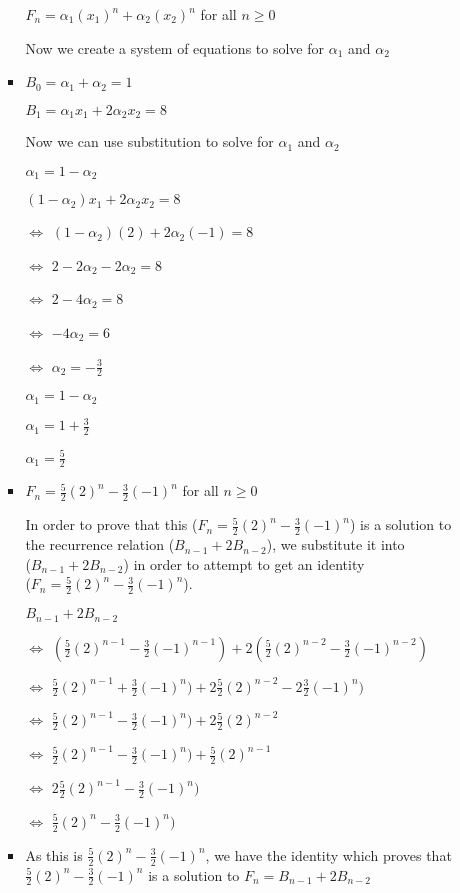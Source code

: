 \documentclass{article}
\begin{document}
\begin{enumerate}
\begin{enumerate}
\begin{itemize}
      $F_{n}=\alpha_{1}(x_{1})^{n}+\alpha_{2}(x_{2})^{n} $ for all $n\geq0$
    \item [] Now we create a system of equations to solve for $\alpha_{1}$ and $\alpha_{2}$
    \item $B_{0}=\alpha_{1}+\alpha_{2}=1$
    \item [] $B_{1}=\alpha_{1}x_{1}+2\alpha_{2}x_{2}=8$
    \item [] Now we can use substitution to solve for $\alpha_{1}$ and $\alpha_{2}$
    \item [] $\alpha_{1}=1-\alpha_{2}$
    \item [] $(1-\alpha_{2})x_{1} +2\alpha_{2}x_{2}=8$
    \item [$\Leftrightarrow$] $(1-\alpha_{2})(2) +2\alpha_{2}(-1)=8$
    \item [$\Leftrightarrow$] $2-2\alpha_{2} -2\alpha_{2}=8$
    \item [$\Leftrightarrow$] $2-4\alpha_{2}=8$
    \item [$\Leftrightarrow$] $-4\alpha_{2}=6$
    \item [$\Leftrightarrow$] $\alpha_{2}=-\frac{3}{2}$
    \item [] $\alpha_{1}=1-\alpha_{2}$
    \item [] $\alpha_{1}=1+\frac{3}{2}$
    \item [] $\alpha_{1}=\frac{5}{2}$
    \item $F_{n}=\frac{5}{2}(2)^{n}-\frac{3}{2}(-1)^{n} $ for all $n\geq0$
    \item [] In order to prove that this ($F_{n}=\frac{5}{2}(2)^{n}-\frac{3}{2}(-1)^{n}$) is a solution to the recurrence relation ($B_{n-1}+2B_{n-2}$), we substitute it into \\($B_{n-1}+2B_{n-2}$) in order to attempt to get an identity \\($F_{n}=\frac{5}{2}(2)^{n}-\frac{3}{2}(-1)^{n}$).
    \item [] $B_{n-1}+2B_{n-2}$
    \item [$\Leftrightarrow$] $(\frac{5}{2}(2)^{n-1}-\frac{3}{2}(-1)^{n-1})+2(\frac{5}{2}(2)^{n-2}-\frac{3}{2}(-1)^{n-2})$
    \item [$\Leftrightarrow$] $\frac{5}{2}(2)^{n-1}+\frac{3}{2}(-1)^{n})+2\frac{5}{2}(2)^{n-2}-2\frac{3}{2}(-1)^{n})$
    \item [$\Leftrightarrow$] $\frac{5}{2}(2)^{n-1}-\frac{3}{2}(-1)^{n})+2\frac{5}{2}(2)^{n-2}$
    \item [$\Leftrightarrow$] $\frac{5}{2}(2)^{n-1}-\frac{3}{2}(-1)^{n})+\frac{5}{2}(2)^{n-1}$
    \item [$\Leftrightarrow$] $2\frac{5}{2}(2)^{n-1}-\frac{3}{2}(-1)^{n})$
    \item [$\Leftrightarrow$] $\frac{5}{2}(2)^{n}-\frac{3}{2}(-1)^{n})$
    \item As this is $\frac{5}{2}(2)^{n}-\frac{3}{2}(-1)^{n}$, we have the identity which proves that $\frac{5}{2}(2)^{n}-\frac{3}{2}(-1)^{n}$ is a solution to $F_{n}=B_{n-1}+2B_{n-2}$
    \end{itemize}
  \end{enumerate}
\end{enumerate}
\end{document}
